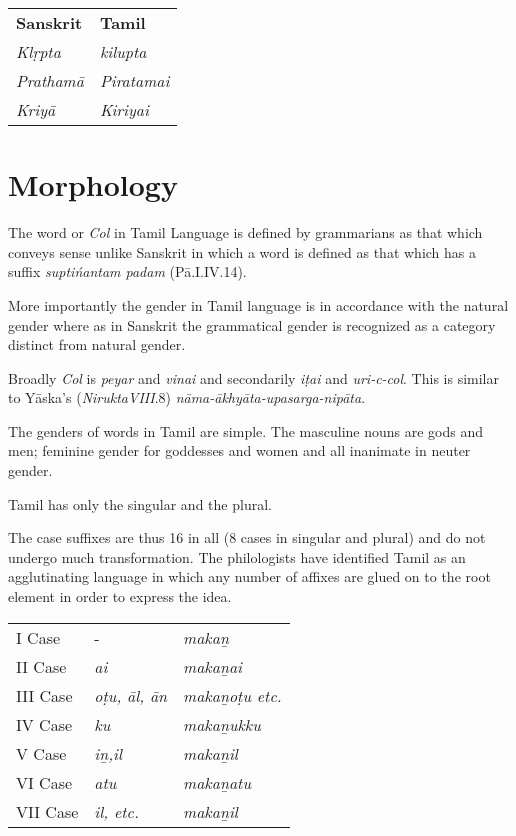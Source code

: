 \begin{longtable}{p{2.5cm}p{2.5cm}}
\textbf{Sanskrit} & \textbf{Tamil} \\
\textit{Klṛpta} & \textit{kilupta} \\
\textit{Prathamā} & \textit{Piratamai} \\
\textit{Kriyā} & \textit{Kiriyai} \\
\end{longtable}


\section*{Morphology}

The word or \textit{Col} in Tamil Language is defined by grammarians as that which conveys sense unlike Sanskrit in which a word is defined as that which has a suffix \textit{suptińantam padam} (Pā.I.IV.14).

More importantly the gender in Tamil language is in accordance with the natural gender where as in Sanskrit the grammatical gender is recognized as a category distinct from natural gender.

Broadly \textit{Col} is \textit{peyar} and \textit{vinai} and secondarily \textit{iṭai} and \textit{uri-c-col}. This is similar to Yāska’s (\textit{NiruktaVIII}.8) \textit{nāma-ākhyāta-upasarga-nipāta}.

The genders of words in Tamil are simple. The masculine nouns are gods and men; feminine gender for goddesses and women and all inanimate in neuter gender.

Tamil has only the singular and the plural.

The case suffixes are thus 16 in all (8 cases in singular and plural) and do not undergo much transformation. The philologists have identified Tamil as an agglutinating language in which any number of affixes are glued on to the root element in order to express the idea.

\newpage

\begin{longtable}{lll}
I Case & - & \textit{makaṉ} \\
II Case  & \textit{ai} & \textit{makaṉai} \\
III Case & \textit{oṭu, āl, ān} & \textit{makaṉoṭu etc.} \\
IV Case & \textit{ku} & \textit{makaṉukku} \\
V Case & \textit{iṉ,il} & \textit{makaṉil} \\
VI Case & \textit{atu} & \textit{makaṉatu} \\
VII Case & \textit{il, etc.} & \textit{makaṉil} \\
\end{longtable}

